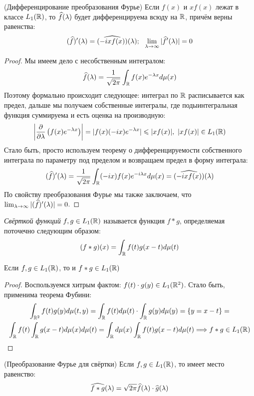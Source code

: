 \begin{theorem} (Дифференцирование преобразования Фурье)
	Если $f(x)$ и $xf(x)$ лежат в классе $L_1(\mathbb{R})$, то $\widehat{f}(\lambda)$ будет дифференцируема всюду на $\mathbb{R}$, причём верны равенства:
	\[
		(\widehat{f})'(\lambda) = \widehat{(-ixf(x))}(\lambda);\ \ \lim_{\lambda \to \infty} |\widehat{f}'(\lambda)| = 0
	\]
\end{theorem}

\begin{proof}
	Мы имеем дело с несобственным интегралом:
	\[
		\widehat{f}(\lambda) = \frac{1}{\sqrt{2\pi}} \int_{\mathbb{R}} f(x)e^{-\lambda x}d\mu(x)
	\]
	Поэтому формально происходит следующее: интеграл по $\mathbb{R}$ расписывается как предел, дальше мы получаем собственные интегралы, где подыинтегральная функция суммируема и есть оценка на производную:
	\[
		\left|\frac{\partial }{\partial \lambda}\left(f(x)e^{-\lambda x}\right)\right| = |f(x)(-ix)e^{-\lambda x}| \leqslant |xf(x)|,\ |xf(x)| \in L_1(\mathbb{R})
	\]
	Стало быть, просто используем теорему о дифференцируемости собственного интеграла по параметру под пределом и возвращаем предел в форму интеграла:
	\[
		(\widehat{f})'(\lambda) = \frac{1}{\sqrt{2\pi}} \int_{\mathbb{R}} (-ix)f(x)e^{-i\lambda x}d\mu(x) = (\widehat{-ixf(x)})(\lambda)
	\]
	По свойству преобразования Фурье мы также заключаем, что $\lim_{\lambda \to \infty} |(\widehat{f})'(\lambda)| = 0$.
\end{proof}

\begin{definition}
	\textit{Свёрткой функций} $f, g \in L_1(\mathbb{R})$ называется функция $f * g$, определяемая поточечно следующим образом:
	\[
		(f * g)(x) = \int_{\mathbb{R}} f(t)g(x - t)d\mu(t)
	\]
\end{definition}

\begin{proposition}
	Если $f, g \in L_1(\mathbb{R})$, то и $f * g \in L_1(\mathbb{R})$
\end{proposition}

\begin{proof}
	Воспользуемся хитрым фактом: $f(t) \cdot g(y) \in L_1(\mathbb{R}^2)$. Стало быть, применима теорема Фубини:
	\begin{multline*}
		\int_{\mathbb{R}^2} f(t)g(y)d\mu(t, y) = \int_{\mathbb{R}} f(t)d\mu(t) \cdot \int_{\mathbb{R}} g(y)d\mu(y) = \{y = x - t\} =
		\\
		\int_{\mathbb{R}} f(t) \int_{\mathbb{R}} g(x - t)d\mu(x)d\mu(t) = \int_{\mathbb{R}} d\mu(x) \int_{\mathbb{R}} f(t)g(x - t)d\mu(t) \Longrightarrow f * g \in L_1(\mathbb{R})
	\end{multline*}
\end{proof}

\begin{theorem} (Преобразование Фурье для свёртки)
	Если $f, g \in L_1(\mathbb{R})$, то имеет место равенство:
	\[
		\widehat{f * g}(\lambda) = \sqrt{2\pi}\widehat{f}(\lambda) \cdot \widehat{g}(\lambda)
	\]
\end{theorem}

